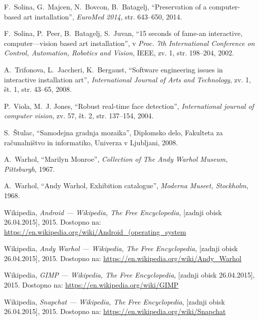 \documentclass[a4paper, 12pt]{book}
\begin{document}
\begin{thebibliography}{99}
F.~Solina, G.~Majcen, N.~Bovcon, B.~Batagelj, ``Preservation of a computer-based art installation'', \textit{EuroMed 2014}, str. 643--650, 2014.

F.~Solina, P.~Peer, B.~Batagelj, S.~Juvan, ``15 seconds of fame-an interactive, computer---vision based art installation'', v \textit{Proc. 7th International Conference on Control, Automation, Robotics and Vision}, IEEE, zv. 1, str. 198--204, 2002.

A.~Trifonova, L.~Jaccheri, K.~Bergaust, ``Software engineering issues in interactive installation art'', \textit{International Journal of Arts and Technology}, zv. 1, št. 1, str. 43--65, 2008.

P.~Viola, M.~J. Jones, ``Robust real-time face detection'', \textit{International journal of computer vision}, zv. 57, št. 2, str. 137--154, 2004.

S.~Štulac, ``Samodejna gradnja mozaika'', Diplomsko delo, Fakulteta za računalništvo in informatiko, Univerza v Ljubljani, 2008.

A.~Warhol, ``Marilyn Monroe'', \textit{Collection of The Andy Warhol Museum, Pittsburgh}, 1967.

A.~Warhol, ``Andy Warhol, Exhibition catalogue'', \textit{Moderna Museet, Stockholm}, 1968.

Wikipedia, \textit{Android --- Wikipedia, The Free Encyclopedia}, [zadnji obisk 26.04.2015], 2015. Dostopno na: \url{https://en.wikipedia.org/wiki/Android_(operating_system}

Wikipedia, \textit{Andy Warhol --- Wikipedia, The Free Encyclopedia}, [zadnji obisk 26.04.2015], 2015. Dostopno na: \url{https://en.wikipedia.org/wiki/Andy_Warhol}

Wikipedia, \textit{GIMP --- Wikipedia, The Free Encyclopedia}, [zadnji obisk 26.04.2015], 2015. Dostopno na: \url{https://en.wikipedia.org/wiki/GIMP}

Wikipedia, \textit{Snapchat --- Wikipedia, The Free Encyclopedia}, [zadnji obisk 26.04.2015], 2015. Dostopno na: \url{https://en.wikipedia.org/wiki/Snapchat}
\end{thebibliography}



\backmatter
\end{document}
